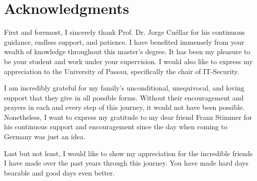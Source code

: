 \chapter*{Acknowledgments}

First and foremost, I sincerely thank Prof. Dr. Jorge Cu\'{e}llar for his continuous guidance, endless support, and patience. I have benefited immensely from your wealth of knowledge throughout this master's degree. It has been my pleasure to be your student and work under your supervision. I would also like to express my appreciation to the University of Passau, specifically the chair of IT-Security.

I am incredibly grateful for my family's unconditional, unequivocal, and loving support that they give in all possible forms. Without their encouragement and prayers in each and every step of this journey, it would not have been possible. Nonetheless, I want to express my gratitude to my dear friend Franz Stimmer for his continuous support and encouragement since the day when coming to Germany was just an idea.

Last but not least, I would like to show my appreciation for the incredible friends I have made over the past years through this journey. You have made hard days bearable and good days even better.

